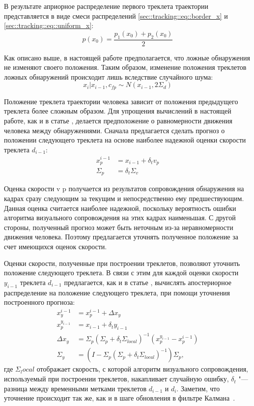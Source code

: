 В результате априорное распределение первого треклета траектории представляется в виде смеси распределений \eqref{sec::tracking::eq::border_x} и \eqref{sec::tracking::eq::uniform_x}:
\begin{equation}
	p(x_0) = \frac{p_1(x_0) + p_2(x_0)}{2}
\end{equation}

Как описано выше, в настоящей работе предполагается, что ложные обнаружения не изменяют своего положения. Таким образом, изменение положения треклетов ложных обнаружений происходит лишь вследствие случайного шума:
\begin{equation}
	x_i\bigg\rvert x_{i-1}, c_{fp} \sim N(x_{i-1}, 2\Sigma_d)
\end{equation}

Положение треклета траектории человека зависит от положения предыдущего треклета более сложным образом. Для упрощения вычислений в настоящей работе, как и в статье \cite{benfold2011stable}, делается предположение о равномерности движения человека между
обнаружениями. Сначала предлагается сделать прогноз о положении следующего треклета на основе наиболее надежной оценки скорости треклета $d_{i-1}$:
\begin{equation}
	\begin{aligned}
		x_p^{i-1} &= x_{i-1} + \delta_t v_p \\
		\Sigma_p &= \delta_t\Sigma_v
	\end{aligned}
\end{equation}

Оценка скорости v p получается из результатов сопровождения обнаружения на кадрах сразу следующим за текущим и непосредственно ему предшествующим. Данная оценка считается наиболее надежной, поскольку вероятность ошибки алгоритма визуального сопровождения на этих кадрах наименьшая. С другой стороны, полученный прогноз может быть неточным из-за неравномерности движения человека. Поэтому предлагается уточнять полученное положение за счет имеющихся оценок скорости.

Оценки скорости, полученные при построении треклетов, позволяют уточнить положение следующего треклета. В связи с этим для каждой оценки скорости $y_{i-1}$ треклета $d_{i-1}$ предлагается, как и в статье \cite{benfold2011stable}, вычислять апостериорное распределение на положение следующего треклета, при помощи уточнения построенного прогноза:
\begin{align}
	x_y^{i-1}&=x_p^{i-1} + \Delta x_y \\
	x_p^{y_{i-1}}&= x_{i-1} + \delta_t y_{i-1} \\
	\Delta x_y &= \Sigma_p (\Sigma_p + \delta_t \Sigma_{local})^{-1}(x_p^{y_{i-1}} - x_p^{i-1}) \\
	\Sigma_y &= (I - \Sigma_p(\Sigma_p + \delta_t \Sigma_{local})^{-1})\Sigma_p,
\end{align}
где $\Sigma_local$ отображает скорость, с которой алгоритм визуального сопровождения, используемый при построении треклетов, накапливает случайную ошибку, $\delta_t$ "--- разница между временными метками треклетов $d_{i-1}$ и $d_i$. Заметим, что уточнение происходит так же, как и в шаге обновления в фильтре Калмана~\cite{kalman1960new}.

